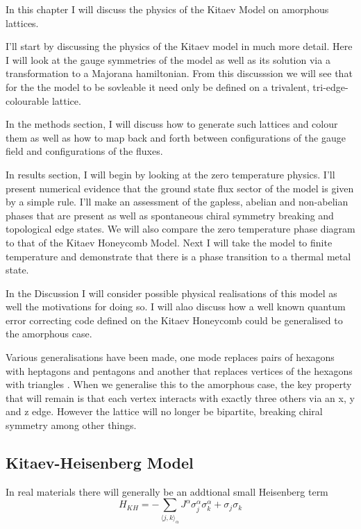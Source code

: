 In this chapter I will discuss the physics of the Kitaev Model on
amorphous lattices.

I'll start by discussing the physics of the Kitaev model in much more
detail. Here I will look at the gauge symmetries of the model as well as
its solution via a transformation to a Majorana hamiltonian. From this
discusssion we will see that for the the model to be sovleable it need
only be defined on a trivalent, tri-edge-colourable lattice.

In the methods section, I will discuss how to generate such lattices and
colour them as well as how to map back and forth between configurations
of the gauge field and configurations of the fluxes.

In results section, I will begin by looking at the zero temperature
physics. I'll present numerical evidence that the ground state flux
sector of the model is given by a simple rule. I'll make an assessment
of the gapless, abelian and non-abelian phases that are present as well
as spontaneous chiral symmetry breaking and topological edge states. We
will also compare the zero temperature phase diagram to that of the
Kitaev Honeycomb Model. Next I will take the model to finite temperature
and demonstrate that there is a phase transition to a thermal metal
state.

In the Discussion I will consider possible physical realisations of this
model as well the motivations for doing so. I will alao discuss how a
well known quantum error correcting code defined on the Kitaev Honeycomb
could be generalised to the amorphous case.

Various generalisations have been made, one mode replaces pairs of
hexagons with heptagons and pentagons
\cite{periNonAbelianChiralSpin2020} and another that replaces vertices
of the hexagons with triangles \cite{yaoExactChiralSpin2007}. When we
generalise this to the amorphous case, the key property that will remain
is that each vertex interacts with exactly three others via an x, y and
z edge. However the lattice will no longer be bipartite, breaking chiral
symmetry among other things.

\hypertarget{kitaev-heisenberg-model}{%
\subsection{Kitaev-Heisenberg Model}\label{kitaev-heisenberg-model}}

In real materials there will generally be an addtional small Heisenberg
term
\[H_{KH} =  - \sum_{\langle j,k\rangle_\alpha} J^{\alpha}\sigma_j^{\alpha}\sigma_k^{\alpha} + \sigma_j\sigma_k\]

